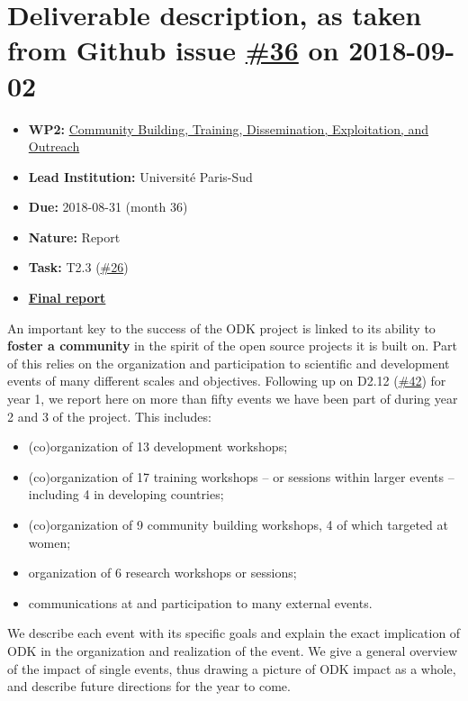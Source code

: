 \section*{\texorpdfstring{Deliverable description, as taken from Github
issue
\href{https://github.com/OpenDreamKit/OpenDreamKit/issues/36}{\#36} on
2018-09-02}{Deliverable description, as taken from Github issue \#36 on 2018-09-02}}\label{deliverable-description-as-taken-from-github-issue-36-on-2018-09-02}

\begin{itemize}
\tightlist
\item
  \textbf{WP2:}
  \href{https://github.com/OpenDreamKit/OpenDreamKit/tree/master/WP2}{Community
  Building, Training, Dissemination, Exploitation, and Outreach}
\item
  \textbf{Lead Institution:} Université Paris-Sud
\item
  \textbf{Due:} 2018-08-31 (month 36)
\item
  \textbf{Nature:} Report
\item
  \textbf{Task:} T2.3
  (\href{https://github.com/OpenDreamKit/OpenDreamKit/issues/26}{\#26})
\item
  \textbf{\href{https://github.com/OpenDreamKit/OpenDreamKit/raw/master/WP2/D2.11/report-final.pdf}{Final
  report}}
\end{itemize}

An important key to the success of the ODK project is linked to its
ability to \textbf{foster a community} in the spirit of the open source
projects it is built on. Part of this relies on the organization and
participation to scientific and development events of many different
scales and objectives. Following up on D2.12
(\href{https://github.com/OpenDreamKit/OpenDreamKit/issues/42}{\#42})
for year 1, we report here on more than fifty events we have been part
of during year 2 and 3 of the project. This includes:

\begin{itemize}
\tightlist
\item
  (co)organization of 13 development workshops;
\item
  (co)organization of 17 training workshops -- or sessions within larger
  events -- including 4 in developing countries;
\item
  (co)organization of 9 community building workshops, 4 of which
  targeted at women;
\item
  organization of 6 research workshops or sessions;
\item
  communications at and participation to many external events.
\end{itemize}

We describe each event with its specific goals and explain the exact
implication of ODK in the organization and realization of the event. We
give a general overview of the impact of single events, thus drawing a
picture of ODK impact as a whole, and describe future directions for the
year to come.
